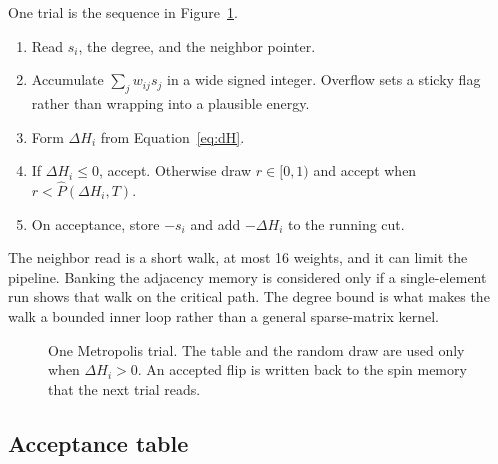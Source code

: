 \documentclass[10pt,twocolumn]{article}
\begin{document}
One trial is the sequence in Figure~\ref{fig:pe}.
\begin{enumerate}
\item Read \(s_i\), the degree, and the neighbor pointer.
\item Accumulate \(\sum_j w_{ij}s_j\) in a wide signed integer.
  Overflow sets a sticky flag rather than wrapping into a plausible energy.
\item Form \(\Delta H_i\) from Equation~\eqref{eq:dH}.
\item If \(\Delta H_i\le 0\), accept.
  Otherwise draw \(r\in[0,1)\) and accept when \(r<\hat{P}(\Delta H_i,T)\).
\item On acceptance, store \(-s_i\) and add \(-\Delta H_i\) to the running cut.
\end{enumerate}
The neighbor read is a short walk, at most 16 weights, and it can limit the pipeline.
Banking the adjacency memory is considered only if a single-element run shows that walk on the critical path.
The degree bound is what makes the walk a bounded inner loop rather than a general sparse-matrix kernel.

\begin{figure}[t]
\centering
{}
\caption{One Metropolis trial.
The table and the random draw are used only when \(\Delta H_i>0\).
An accepted flip is written back to the spin memory that the next trial reads.}
\label{fig:pe}
\end{figure}

\subsection{Acceptance table}
\end{document}
